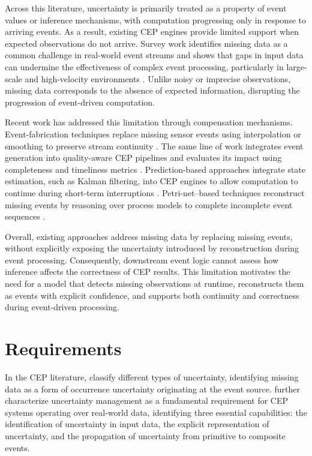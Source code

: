 Across this literature, uncertainty is primarily treated as a property of event values or inference mechanisms, with computation progressing only in response to arriving events. As a result, existing CEP engines provide limited support when expected observations do not arrive. Survey work identifies missing data as a common challenge in real-world event streams and shows that gaps in input data can undermine the effectiveness of complex event processing, particularly in large-scale and high-velocity environments \citep{tawsif2018review}. Unlike noisy or imprecise observations, missing data corresponds to the absence of expected information, disrupting the progression of event-driven computation.

Recent work has addressed this limitation through compensation mechanisms. Event-fabrication techniques replace missing sensor events using interpolation or smoothing to preserve stream continuity \citep{gkoulis2025assessing}. The same line of work integrates event generation into quality-aware CEP pipelines and evaluates its impact using completeness and timeliness metrics \citep{gkoulis2024hybrid}. Prediction-based approaches integrate state estimation, such as Kalman filtering, into CEP engines to allow computation to continue during short-term interruptions \citep{vijayakumar2009missing}. Petri-net–based techniques reconstruct missing events by reasoning over process models to complete incomplete event sequences \citep{wang2013efficient}.

Overall, existing approaches address missing data by replacing missing events, without explicitly exposing the uncertainty introduced by reconstruction during event processing. Consequently, downstream event logic cannot assess how inference affects the correctness of CEP results. This limitation motivates the need for a model that detects missing observations at runtime, reconstructs them as events with explicit confidence, and supports both continuity and correctness during event-driven processing.


\section{Requirements}
\label{sec:requirements}


In the CEP literature, \citet{wasserkrug2006taxonomy} classify different types of uncertainty, identifying missing data as a form of occurrence uncertainty originating at the event source. \citet{cugola2015complex} further characterize uncertainty management as a fundamental requirement for CEP systems operating over real-world data, identifying three essential capabilities: the identification of uncertainty in input data, the explicit representation of uncertainty, and the propagation of uncertainty from primitive to composite events.

